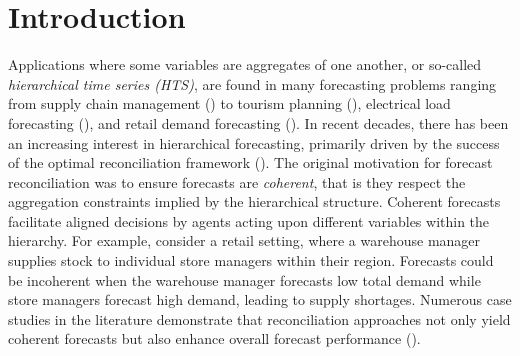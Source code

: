 \documentclass[a4paper,review,12pt,authoryear]{elsarticle}
\begin{document}
\newpage

\section{Introduction}



Applications where some variables are aggregates of one another, or so-called \textit{hierarchical time series (HTS)}, are found in many forecasting problems ranging from supply chain management (\citealp{syntetosSupplyChainForecasting2016}) to tourism planning (\citealp{kourentzesCrosstemporalCoherentForecasts2019}), electrical load forecasting (\citealp{jeonProbabilisticForecastReconciliation2019}), and retail demand forecasting (\citealp{makridakisM5AccuracyCompetition2022}). In recent decades, there has been an increasing interest in hierarchical forecasting, primarily driven by the success of the optimal reconciliation framework (\citealp{hyndmanOptimalCombinationForecasts2011,wickramasuriyaOptimalForecastReconciliation2019, panagiotelisProbabilisticForecastReconciliation2023}). The original motivation for forecast reconciliation was to ensure forecasts are \textit{coherent}, that is they respect the aggregation constraints implied by the hierarchical structure. Coherent forecasts facilitate aligned decisions by agents acting upon different variables within the hierarchy. For example, consider a retail setting, where a warehouse manager supplies stock to individual store managers within their region. Forecasts could be incoherent when the warehouse manager forecasts low total demand while store managers forecast high demand, leading to supply shortages. Numerous case studies in the literature demonstrate that reconciliation approaches not only yield coherent forecasts but also enhance overall forecast performance (\citealp{AthanasopoulosForecastReconciliationReview2023}).
\end{document}
